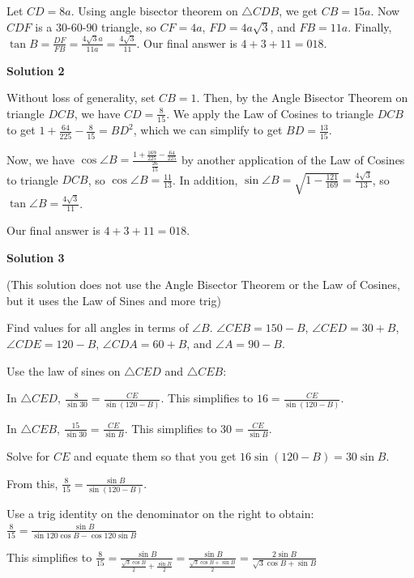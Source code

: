 \begin{enumerate}
 Let $CD = 8a$. Using angle bisector theorem on $\triangle CDB$, we get $CB = 15a$. Now $CDF$ is a $30$-$60$-$90$ triangle, so $CF = 4a$, $FD = 4a\sqrt{3}$, and $FB = 11a$.  Finally, $\tan{B} = \frac{DF}{FB}=\frac{4\sqrt{3}a}{11a} = \frac{4\sqrt{3}}{11}$. Our final answer is $4 + 3 + 11 = \boxed{018}$.

 



\textbf{Solution 2}

Without loss of generality, set $CB = 1$. Then, by the Angle Bisector Theorem on triangle $DCB$, we have $CD = \frac{8}{15}$. We apply the Law of Cosines to triangle $DCB$ to get $1 + \frac{64}{225} - \frac{8}{15} = BD^{2}$, which we can simplify to get $BD = \frac{13}{15}$. 

 Now, we have $\cos \angle B = \frac{1 + \frac{169}{225} - \frac{64}{225}}{\frac{26}{15}}$ by another application of the Law of Cosines to triangle $DCB$, so $\cos \angle B = \frac{11}{13}$. In addition, $\sin \angle B = \sqrt{1 - \frac{121}{169}} = \frac{4\sqrt{3}}{13}$, so $\tan \angle B = \frac{4\sqrt{3}}{11}$. 

 Our final answer is $4+3+11 = \boxed{018}$.

 



\textbf{Solution 3}

(This solution does not use the Angle Bisector Theorem or the Law of Cosines, but it uses the Law of Sines and more trig)

 Find values for all angles in terms of $\angle B$. $\angle CEB = 150-B$, $\angle CED = 30+B$, $\angle CDE = 120-B$, $\angle CDA = 60+B$, and $\angle A = 90-B$.

 Use the law of sines on $\triangle CED$ and $\triangle CEB$:

 In $\triangle CED$, $\frac{8}{\sin 30} = \frac{CE}{\sin (120-B)}$. This simplifies to $16 = \frac{CE}{\sin (120-B)}$.

 In $\triangle CEB$, $\frac{15}{\sin 30} = \frac{CE}{\sin B}$. This simplifies to $30 = \frac{CE}{\sin B}$.

 Solve for $CE$ and equate them so that you get $16\sin (120-B) = 30\sin B$. 

 From this, $\frac{8}{15} = \frac{\sin B}{\sin (120-B)}$. 

 Use a trig identity on the denominator on the right to obtain:  $\frac{8}{15} = \frac{\sin B}{\sin 120 \cos B - \cos 120 \sin B}$

 This simplifies to $\frac{8}{15} = \frac{\sin B}{\frac{\sqrt{3}\cos B}{2} + \frac{\sin B}{2}} = \frac{\sin B}{\frac{\sqrt{3} \cos B + \sin B}{2}} = \frac{2\sin B}{\sqrt{3}\cos B + \sin B}$


\end{enumerate}
